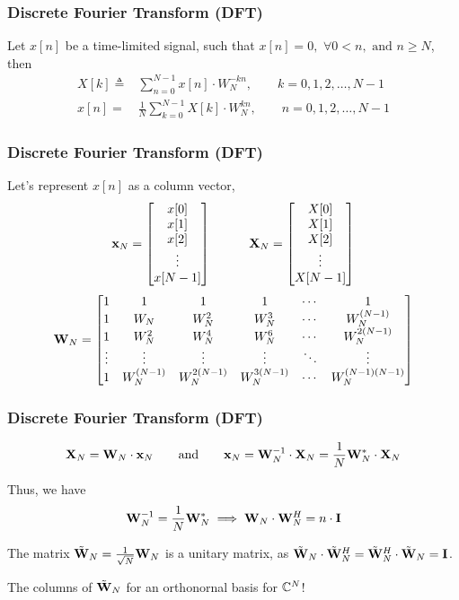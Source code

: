 \documentclass[aspectratio=169]{beamer}
\def\mf{\ensuremath\mathbf}
\def\mb{\ensuremath\mathbb}
\def\emx{\ensuremath\end{bmatrix*}}
\def\bmxc{\ensuremath\begin{bmatrix*}[c]}
\begin{document}
\begin{frame}[t]
  \frametitle{Discrete Fourier Transform (DFT)}

  Let $x[n]$ be a time-limited signal, such that $x[n] = 0, \,\, \forall 0 < n, \,\,\text{and} \,\, n \geq N$, then
  \[ \begin{split}
      X[k] \triangleq &\sum_{n=0}^{N-1} x[n] \cdot W_N^{-kn}, \quad \quad k = 0, 1, 2, \ldots, N-1\\ 
      x[n] = &\frac{1}{N}\sum_{k=0}^{N-1} X[k] \cdot W_N^{kn}, \quad \quad n = 0, 1, 2, \ldots, N-1
     \end{split} \]
\end{frame}


\begin{frame}[t]
  \frametitle{Discrete Fourier Transform (DFT)}
  Let's represent $x[n]$ as a column vector,
  \[ \mf{x}_N = \bmxc x[0] \\ x[1] \\ x[2] \\ \vdots \\ x[N-1] \emx \quad \quad \quad \mf{X}_N = \bmxc X[0] \\ X[1] \\ X[2] \\ \vdots \\ X[N-1] \emx \]
  \[ \mf{W}_N = \bmxc 1      & 1           & 1              & 1            & \cdots & 1 \\ 
                      1      & W_N         & W_N^2          & W_N^3        & \cdots & W_N^{(N-1)} \\
                      1      & W_N^2       & W_N^4          & W_N^6        & \cdots & W_N^{2(N-1)} \\
                      \vdots & \vdots      & \vdots         & \vdots       & \ddots & \vdots \\
                      1      & W_N^{(N-1)} & W_N^{2(N-1)} & W_N^{3(N-1)} & \cdots & W_N^{(N-1)(N-1)}
                     \emx \]
\end{frame}


\begin{frame}[t]
  \frametitle{Discrete Fourier Transform (DFT)}
  \[ \mf{X}_N = \mf{W}_N \cdot \mf{x}_N \quad \quad \text{and} \quad \quad \mf{x}_N = \mf{W}_N^{-1} \cdot \mf{X}_N = \frac{1}{N}\mf{W}_N^{*}\cdot \mf{X}_N \]

  Thus, we have
  \[ \mf{W}_N^{-1} = \frac{1}{N}\mf{W}_N^{*} \implies \mf{W}_N \cdot \mf{W}_N^{H} = n \cdot \mf{I} \]
  \vspace{0.7cm}

  The matrix $\tilde{\mf{W}}_N = \frac{1}{\sqrt{N}}\mf{W}_N$ is a unitary matrix, as $\tilde{\mf{W}}_N \cdot \tilde{\mf{W}}_N^H = \tilde{\mf{W}}_N^H \cdot \tilde{\mf{W}}_N = \mf{I}$.
  \vspace{0.7cm}

  The columns of $\tilde{\mf{W}}_N$ for an orthonornal basis for $\mb{C}^N$!

\end{frame}
\end{document}
